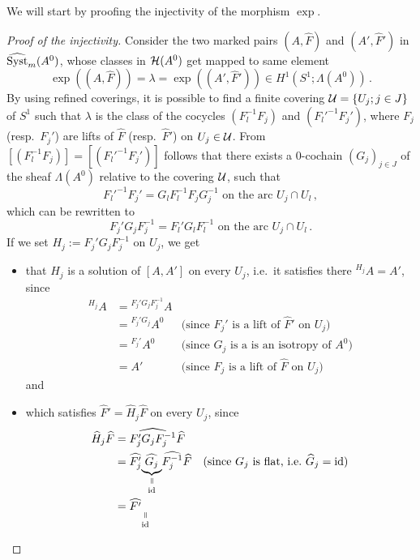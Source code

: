 We will start by proofing the injectivity of the morphism $\exp$.
\begin{proof}[Proof of the injectivity]
  Consider the two marked pairs $(A,\hat F)$ and $(A',\hat F')$ in
  $\widehat{\operatorname{Syst}}_m(A^0)$, whose classes in $\mathcal{H}(A^0)$ get mapped to same element
  \[
    \exp((A,\hat F))=\lambda=\exp((A',\hat F'))
      \in H^1(S^1;\Lambda(A^0)) \,.
  \]
  By using refined coverings, it is possible to find a finite covering
  $\mathcal{U}=\{U_j;j\in J\}$ of $S^1$ such that $\lambda$ is the class of the
  cocycles $(F_l^{-1}F_j)$ and $(F_l'^{-1}F_j')$, where $F_j$ (resp.\ $F_j'$)
  are lifts of $\hat F$ (resp.\ $\hat F'$) on $U_j\in\mathcal{U}$.
  From $[(F_l^{-1}F_j)]=[(F_l'^{-1}F_j')]$ follows that there exists a
  $0$-cochain $(G_j)_{j\in J}$ of the sheaf $\Lambda(A^0)$ relative to the
  covering $\mathcal{U}$, such that
  \[
    F_l'^{-1}F_j'=G_lF_l^{-1}F_jG_j^{-1}
    \text{~on~the~arc~} U_j\cap U_l \,,
  \]
  which can be rewritten to
  \[
    F_j'G_jF_j^{-1} = F_l'G_lF_l^{-1}
    \text{~on~the~arc~} U_j\cap U_l \,.
  \]
  If we set $H_j:=F_j'G_{j}F_j^{-1}$ on $U_{j}$, we get
  \begin{itemize}
    \item that $H_j$ is a solution of $[A,A']$ on every $U_j$, i.e.\ it
      satisfies there ${}^{H_j}A=A'$, since
      \begin{align*}
        {}^{H_j}A &= {}^{F_j'G_{j}F_j^{-1}}A
        \\&={}^{F_j'G_{j}}A^0
        & \text{(since $F_j'$ is a lift of $\hat F'$ on $U_j$)}
        \\&={}^{F_j'}A^0
        & \text{(since $G_j$ is a is an isotropy of $A^0$)}
        \\&=A'
        & \text{(since $F_j$ is a lift of $\hat F$ on $U_j$)}
      \end{align*}
      and
    \item which satisfies $\hat F'=\hat H_j\hat F$ on every $U_j$, since
      \begin{align*}
        \hat H_j\hat F&= \widehat{F_j'G_{j}F_j^{-1}} \hat F
        \\&= \hat{F_j'}
        \underset{\id}{%
          \underset{\text{\rotatebox[origin=c]{-90}{$=$}}}{%
            \underbrace{%
              \hat{G_{j}}
            }
          }
        }
        \hat{F_j^{-1}} \hat F
        & \text{(since $G_j$ is flat, i.e.\ $\hat G_j=\id$)}
        \\&= \hat{F'}
        \underset{\id}{%
          \underset{\text{\rotatebox[origin=c]{-90}{$=$}}}{%
}}
\end{align*}
\end{itemize}
\end{proof}
